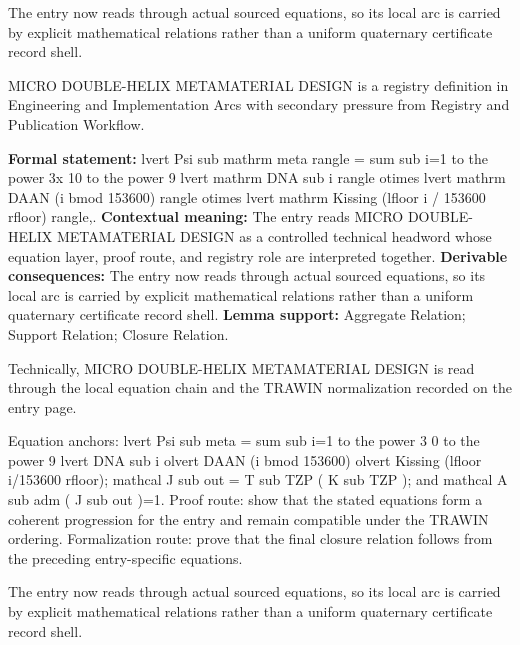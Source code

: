 The entry now reads through actual sourced equations, so its local arc is carried by explicit mathematical relations rather than a uniform quaternary certificate record shell.
\clearpage


\begingroup\small
{}
MICRO DOUBLE-HELIX METAMATERIAL DESIGN is a registry definition in Engineering and Implementation Arcs with secondary pressure from Registry and Publication Workflow.

\begingroup\footnotesize\setlength{\emergencystretch}{3em}\sloppy
\textbf{Formal statement:} lvert Psi sub mathrm meta rangle = sum sub i=1 to the power 3x 10 to the power 9 lvert mathrm DNA sub i rangle otimes lvert mathrm DAAN (i bmod 153600) rangle otimes lvert mathrm Kissing (lfloor i / 153600 rfloor) rangle,. \textbf{Contextual meaning:} The entry reads MICRO DOUBLE-HELIX METAMATERIAL DESIGN as a controlled technical headword whose equation layer, proof route, and registry role are interpreted together. \textbf{Derivable consequences:} The entry now reads through actual sourced equations, so its local arc is carried by explicit mathematical relations rather than a uniform quaternary certificate record shell. \textbf{Lemma support:} Aggregate Relation; Support Relation; Closure Relation.\par
\endgroup

Technically, MICRO DOUBLE-HELIX METAMATERIAL DESIGN is read through the local equation chain and the TRAWIN normalization recorded on the entry page.

Equation anchors: lvert Psi sub meta = sum sub i=1 to the power 3 0 to the power 9 lvert DNA sub i olvert DAAN (i bmod 153600) olvert Kissing (lfloor i/153600 rfloor); mathcal J sub out = T sub TZP ( K sub TZP ); and mathcal A sub adm ( J sub out )=1. Proof route: show that the stated equations form a coherent progression for the entry and remain compatible under the TRAWIN ordering. Formalization route: prove that the final closure relation follows from the preceding entry-specific equations.

The entry now reads through actual sourced equations, so its local arc is carried by explicit mathematical relations rather than a uniform quaternary certificate record shell.
\endgroup

